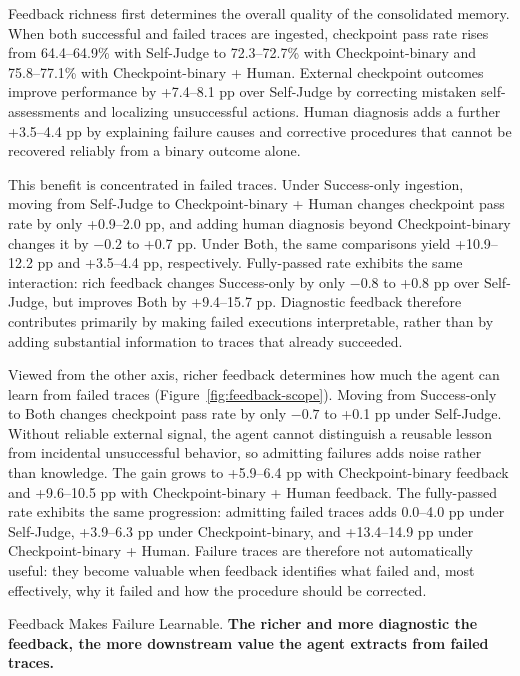 Feedback richness first determines the overall quality of the consolidated
memory. When both successful and failed traces are ingested, checkpoint pass
rate rises from 64.4--64.9\% with Self-Judge to 72.3--72.7\% with
Checkpoint-binary and 75.8--77.1\% with Checkpoint-binary + Human. External
checkpoint outcomes improve performance by +7.4--8.1 pp over Self-Judge by
correcting mistaken self-assessments and localizing unsuccessful actions.
Human diagnosis adds a further +3.5--4.4 pp by explaining failure causes and
corrective procedures that cannot be recovered reliably from a binary outcome
alone.

This benefit is concentrated in failed traces. Under Success-only ingestion,
moving from Self-Judge to Checkpoint-binary + Human changes checkpoint pass
rate by only +0.9--2.0 pp, and adding human diagnosis beyond Checkpoint-binary
changes it by $-0.2$ to +0.7 pp. Under Both, the same comparisons yield
+10.9--12.2 pp and +3.5--4.4 pp, respectively. Fully-passed rate exhibits the
same interaction: rich feedback changes Success-only by only $-0.8$ to
+0.8 pp over Self-Judge, but improves Both by +9.4--15.7 pp. Diagnostic
feedback therefore contributes primarily by making failed executions
interpretable, rather than by adding substantial information to traces that
already succeeded.

Viewed from the other axis, richer feedback determines how much the agent can
learn from failed traces (Figure~\ref{fig:feedback-scope}). Moving from
Success-only to Both changes checkpoint pass rate by only $-0.7$ to +0.1 pp
under Self-Judge. Without reliable external signal, the agent cannot
distinguish a reusable lesson from incidental unsuccessful behavior, so
admitting failures adds noise rather than knowledge. The gain grows to
+5.9--6.4 pp with Checkpoint-binary feedback and +9.6--10.5 pp with
Checkpoint-binary + Human feedback. The fully-passed rate exhibits the same
progression: admitting failed traces adds 0.0--4.0 pp under Self-Judge,
+3.9--6.3 pp under Checkpoint-binary, and +13.4--14.9 pp under
Checkpoint-binary + Human. Failure traces are therefore not automatically
useful: they become valuable when feedback identifies what failed and, most
effectively, why it failed and how the procedure should be corrected.

\begin{promptwrapper}{Feedback Makes Failure Learnable.}
\textbf{The richer and more diagnostic the feedback, the more downstream value
the agent extracts from failed traces.}
\end{promptwrapper}


